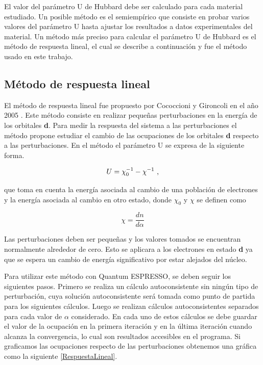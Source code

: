 El valor del par\'ametro U de Hubbard debe ser calculado para cada material estudiado. Un posible m\'etodo es el semiemp\'irico que consiste en probar varios valores del par\'ametro U hasta ajustar los resultados a datos experimentales del material. 
Un m\'etodo m\'as preciso para calcular el par\'ametro U de Hubbard es el m\'etodo de respuesta lineal, el cual se describe a continuaci\'on y fue el m\'etodo usado en este trabajo.

\subsection{M\'etodo de respuesta lineal}

El m\'etodo de respuesta lineal fue propuesto por Cococcioni y Gironcoli en el a\~no 2005 \cite{cococcioni2005}. Este m\'etodo consiste en realizar peque\~nas perturbaciones en la energ\'ia de los orbitales {\bf d}. Para medir la respuesta del sistema a las perturbaciones el m\'etodo propone estudiar el cambio de las ocupaciones de los orbitales {\bf d} respecto a las perturbaciones. En el m\'etodo el par\'ametro U se expresa de la siguiente forma.

\begin{equation}
    U = \chi _{0}^{-1} - \chi ^{-1} \textup{ ,}
\end{equation}

\noindent que toma en cuenta la energ\'ia asociada al cambio de una poblaci\'on de electrones y la energ\'ia asociada al cambio en otro estado, donde $\chi_{0}$ y $\chi$ se definen como

\begin{equation}
    \chi = \frac{dn}{d\alpha}
    \label{definicion_chi}
\end{equation}

\noindent Las perturbaciones deben ser peque\~nas y los valores tomados se encuentran normalmente alrededor de cero. Esto se aplicara a los electrones en estado {\bf d} ya que se espera un cambio de energ\'ia significativo por estar alejados del n\'ucleo.

\noindent Para utilizar este m\'etodo con Quantum ESPRESSO, se deben seguir los siguientes pasos. Primero se realiza un c\'alculo autoconsistente sin ning\'un tipo de perturbaci\'on, cuya soluci\'on autoconsistente ser\'a tomada como punto de partida para los siguientes c\'alculos. Luego se realizan c\'alculos autoconsistentes separados para cada valor de $\alpha $ considerado. En cada uno de estos c\'alculos se debe guardar el valor de la ocupaci\'on en la primera iteraci\'on y en la \'ultima iteraci\'on cuando alcanza la convergencia, lo cual son resultados accesibles en el programa.
Si graficamos las ocupaciones respecto de las perturbaciones obtenemos una gr\'afica como la siguiente \ref{RespuestaLineal}.


